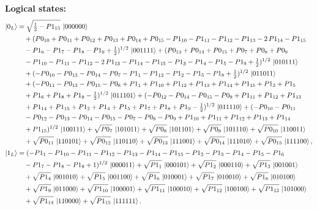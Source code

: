 \documentclass[11pt]{article}
\begin{document}
\noindent\textbf{Logical states:}
\begin{align*}
\ket{0_L} &= \sqrt{\tfrac{1}{2} - P1_{15}}\,\ket{000000}\\
&\quad + (P0_{10} + P0_{11} + P0_{12} + P0_{13} + P0_{14} + P0_{15} - P1_{10} - P1_{11} - P1_{12} - P1_{13} - 2\,P1_{14} - P1_{15}\\
&\quad - P1_6 - P1_7 - P1_8 - P1_9 + \tfrac{1}{2})^{1/2}\,\ket{001111} + (P0_{13} + P0_{14} + P0_{15} + P0_7 + P0_8 + P0_9\\
&\quad- P1_{10} - P1_{11} - P1_{12} - 2\,P1_{13} - P1_{14} - P1_{15} - P1_3 - P1_4 - P1_5 - P1_9 + \tfrac{1}{2})^{1/2}\,\ket{010111}\\
&\quad + (-P0_{10} - P0_{13} - P0_{14} - P0_7 - P1_1 - P1_{12} - P1_2 - P1_5 - P1_8 + \tfrac{1}{2})^{1/2}\,\ket{011011}\\
&\quad + (-P0_{11} - P0_{13} - P0_{15} - P0_8 + P1_1 + P1_{10} + P1_{12} + P1_{13} + P1_{14} + P1_{15} + P1_3 + P1_5 \\
&\quad  + P1_6 + P1_8 + P1_9 - \tfrac{1}{2})^{1/2}\,\ket{011101} + (-P0_{12} - P0_{14} - P0_{15} - P0_9 + P1_{11} + P1_{12} + P1_{13}\\
&\quad + P1_{14} + P1_{15} + P1_2 + P1_4 + P1_5 + P1_7 + P1_8 + P1_9 - \tfrac{1}{2})^{1/2}\,\ket{011110} + (-P0_{10} - P0_{11}\\
&\quad - P0_{12} - P0_{13} - P0_{14} - P0_{15} - P0_7 - P0_8 - P0_9 + P1_{10} + P1_{11} + P1_{12} + P1_{13} + P1_{14}\\
&\quad + P1_{15})^{1/2}\,\ket{100111} + \sqrt{P0_7}\,\ket{101011} + \sqrt{P0_8}\,\ket{101101} + \sqrt{P0_9}\,\ket{101110} + \sqrt{P0_{10}}\,\ket{110011}\\
&\quad + \sqrt{P0_{11}}\,\ket{110101} + \sqrt{P0_{12}}\,\ket{110110} + \sqrt{P0_{13}}\,\ket{111001} + \sqrt{P0_{14}}\,\ket{111010} + \sqrt{P0_{15}}\,\ket{111100},
\\[2pt]
\ket{1_L} &= (-P1_1 - P1_{10} - P1_{11} - P1_{12} - P1_{13} - P1_{14} - P1_{15} - P1_2 - P1_3 - P1_4 - P1_5 - P1_6\\
&\quad - P1_7 - P1_8 - P1_9 + 1)^{1/2}\,\ket{000011} + \sqrt{P1_1}\,\ket{000101} + \sqrt{P1_2}\,\ket{000110} + \sqrt{P1_3}\,\ket{001001}\\
&\quad + \sqrt{P1_4}\,\ket{001010} + \sqrt{P1_5}\,\ket{001100} + \sqrt{P1_6}\,\ket{010001} + \sqrt{P1_7}\,\ket{010010} + \sqrt{P1_8}\,\ket{010100}\\
&\quad + \sqrt{P1_9}\,\ket{011000} + \sqrt{P1_{10}}\,\ket{100001} + \sqrt{P1_{11}}\,\ket{100010} + \sqrt{P1_{12}}\,\ket{100100} + \sqrt{P1_{13}}\,\ket{101000}\\
&\quad + \sqrt{P1_{14}}\,\ket{110000} + \sqrt{P1_{15}}\,\ket{111111}.
\end{align*}
\end{document}
